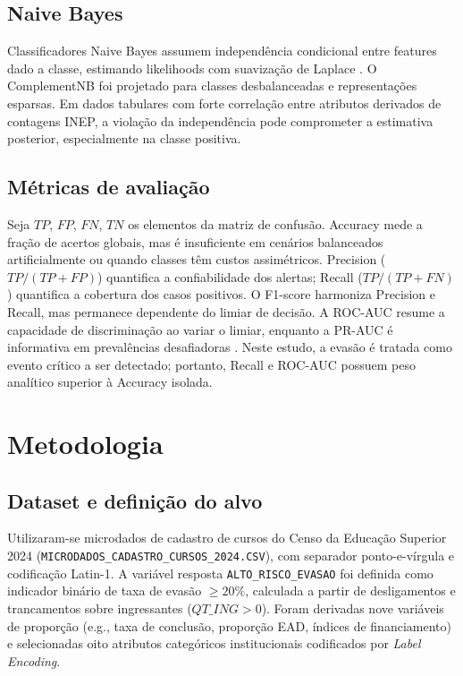 \documentclass[conference]{IEEEtran}
\begin{document}
\subsection{Naive Bayes}
Classificadores Naive Bayes assumem independência condicional entre features dado a classe, estimando likelihoods com suavização de Laplace \cite{domingos2012}. O ComplementNB foi projetado para classes desbalanceadas e representações esparsas. Em dados tabulares com forte correlação entre atributos derivados de contagens INEP, a violação da independência pode comprometer a estimativa posterior, especialmente na classe positiva.

\subsection{Métricas de avaliação}
Seja $TP$, $FP$, $FN$, $TN$ os elementos da matriz de confusão. Accuracy mede a fração de acertos globais, mas é insuficiente em cenários balanceados artificialmente ou quando classes têm custos assimétricos. Precision ($TP/(TP+FP)$) quantifica a confiabilidade dos alertas; Recall ($TP/(TP+FN)$) quantifica a cobertura dos casos positivos. O F1-score harmoniza Precision e Recall, mas permanece dependente do limiar de decisão. A ROC-AUC resume a capacidade de discriminação ao variar o limiar, enquanto a PR-AUC é informativa em prevalências desafiadoras \cite{fawcett2006}. Neste estudo, a evasão é tratada como evento crítico a ser detectado; portanto, Recall e ROC-AUC possuem peso analítico superior à Accuracy isolada.

\section{Metodologia}

\subsection{Dataset e definição do alvo}
Utilizaram-se microdados de cadastro de cursos do Censo da Educação Superior 2024 (\texttt{MICRODADOS\_CADASTRO\_CURSOS\_2024.CSV}), com separador ponto-e-vírgula e codificação Latin-1. A variável resposta \texttt{ALTO\_RISCO\_EVASAO} foi definida como indicador binário de taxa de evasão $\geq 20\%$, calculada a partir de desligamentos e trancamentos sobre ingressantes ($QT\_ING > 0$). Foram derivadas nove variáveis de proporção (e.g., taxa de conclusão, proporção EAD, índices de financiamento) e selecionadas oito atributos categóricos institucionais codificados por \textit{Label Encoding}.
\end{document}
